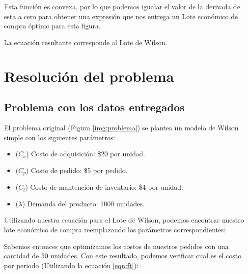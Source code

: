 Esta función es convexa, por lo que podemos igualar el valor de la derivada de esta a cero para obtener una expresión que nos entrega un Lote económico de compra óptimo para esta figura.



La ecuación resultante corresponde al Lote de Wilson.


\section{Resolución del problema}
\subsection{Problema con los datos entregados}
El problema original (Figura \ref{img:problema}) se plantea un modelo de Wilson simple con los siguientes parámetros:

\begin{itemize}
    \item ($C_a$) Costo de adquisición: \$20 por unidad.
    \item ($C_p$) Costo de pedido: \$5 por pedido.
    \item ($C_i$) Costo de mantención de inventario: \$4 por unidad.
    \item ($\lambda$) Demanda del producto: 1000 unidades.
\end{itemize}

Utilizando nuestra ecuación para el Lote de Wilson, podemos encontrar nuestro lote económico de compra reemplazando los parámetros correspondientes:


Sabemos entonces que optimizamos los costos de nuestros pedidos con una cantidad de 50 unidades. Con este resultado, podemos verificar cual es el costo por periodo (Utilizando la ecuación \ref{eqn:ft}):

